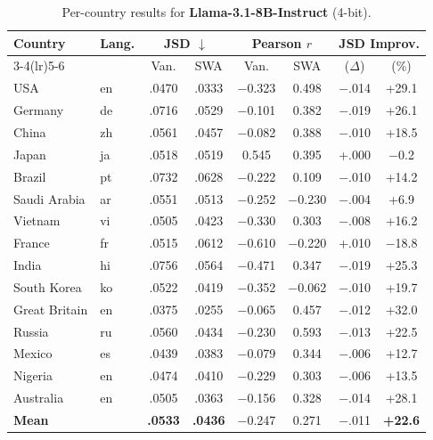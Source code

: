 \documentclass{article}
\newcommand{\gain}[1]{\textcolor{improvegreen}{#1}}
\newcommand{\loss}[1]{\textcolor{worsered}{#1}}
\begin{document}
\begin{table}[h]
\caption{Per-country results for \textbf{Llama-3.1-8B-Instruct} (4-bit).}
\label{tab:llama8b_percountry}
\centering\setlength{\tabcolsep}{3.5pt}\footnotesize
\begin{tabular}{llcccccc}
\toprule
Country & Lang. & \multicolumn{2}{c}{JSD $\downarrow$} & \multicolumn{2}{c}{Pearson $r$} & \multicolumn{2}{c}{JSD Improv.} \\
\cmidrule(lr){3-4}\cmidrule(lr){5-6}
 & & Van. & SWA & Van. & SWA & ($\Delta$) & (\%) \\
\midrule
USA & en &.0470 &.0333 & $-$0.323 & 0.498 & $-$.014 & \gain{+29.1} \\
Germany & de &.0716 &.0529 & $-$0.101 & 0.382 & $-$.019 & \gain{+26.1} \\
China & zh &.0561 &.0457 & $-$0.082 & 0.388 & $-$.010 & \gain{+18.5} \\
Japan & ja &.0518 &.0519 & 0.545 & 0.395 & +.000 & \loss{$-$0.2} \\
Brazil & pt &.0732 &.0628 & $-$0.222 & 0.109 & $-$.010 & \gain{+14.2} \\
Saudi Arabia& ar &.0551 &.0513 & $-$0.252 & $-$0.230 & $-$.004 & \gain{+6.9} \\
Vietnam & vi &.0505 &.0423 & $-$0.330 & 0.303 & $-$.008 & \gain{+16.2} \\
France & fr &.0515 &.0612 & $-$0.610 & $-$0.220 & +.010 & \loss{$-$18.8} \\
India & hi &.0756 &.0564 & $-$0.471 & 0.347 & $-$.019 & \gain{+25.3} \\
South Korea & ko &.0522 &.0419 & $-$0.352 & $-$0.062 & $-$.010 & \gain{+19.7} \\
Great Britain& en&.0375 &.0255 & $-$0.065 & 0.457 & $-$.012 & \gain{+32.0} \\
Russia & ru &.0560 &.0434 & $-$0.230 & 0.593 & $-$.013 & \gain{+22.5} \\
Mexico & es &.0439 &.0383 & $-$0.079 & 0.344 & $-$.006 & \gain{+12.7} \\
Nigeria & en &.0474 &.0410 & $-$0.229 & 0.303 & $-$.006 & \gain{+13.5} \\
Australia & en &.0505 &.0363 & $-$0.156 & 0.328 & $-$.014 & \gain{+28.1} \\
\midrule
\textbf{Mean} & & \textbf{.0533} & \textbf{.0436} & $-$0.247 & 0.271 & $-$.011 & \gain{\textbf{+22.6}} \\
\bottomrule
\end{tabular}
\end{table}
\end{document}
